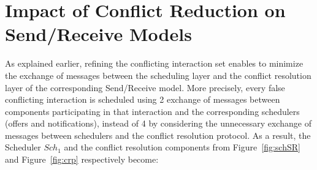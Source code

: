 \section{Impact of Conflict Reduction on Send/Receive Models}
As explained earlier, refining the conflicting interaction set enables to minimize the
exchange of messages between the scheduling layer and the conflict resolution layer
of the corresponding Send/Receive model. More precisely, every false conflicting interaction
is scheduled using 2 exchange of messages between components participating in that interaction
and the corresponding schedulers (offers and notifications), 
instead of 4 by considering the unnecessary exchange of messages between schedulers and 
the conflict resolution protocol.
As a result, the Scheduler $Sch_1$ and the conflict resolution components 
from Figure~\ref{fig:schSR} and Figure~\ref{fig:crp} respectively become:





